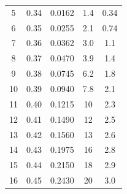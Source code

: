 \begin{center}
\begin{table}[H]
\begin{tabular}{|c|c|c|c|c|}
5  & 0.34 & 0.0162 & 1.4  & 0.34   \\
6  & 0.35 & 0.0255 & 2.1  & 0.74   \\
7  & 0.36 & 0.0362 & 3.0  & 1.1    \\
8  & 0.37 & 0.0470 & 3.9  & 1.4    \\
9  & 0.38 & 0.0745 & 6.2  & 1.8    \\
10 & 0.39 & 0.0940 & 7.8  & 2.1    \\
11 & 0.40 & 0.1215 & 10   & 2.3    \\
12 & 0.41 & 0.1490 & 12   & 2.5    \\
13 & 0.42 & 0.1560 & 13   & 2.6    \\
14 & 0.43 & 0.1975 & 16   & 2.8    \\
15 & 0.44 & 0.2150 & 18   & 2.9    \\
16 & 0.45 & 0.2430 & 20   & 3.0    \\
\hline
\end{tabular}
\end{table}
\end{center}

